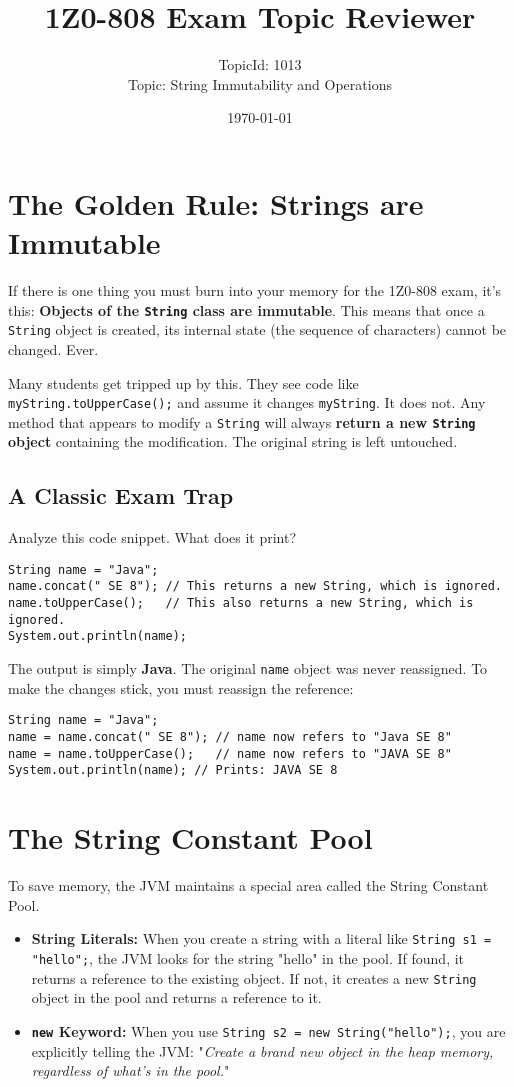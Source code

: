 \documentclass[12pt]{article}
\title{\textbf{1Z0-808 Exam Topic Reviewer}}
\author{TopicId: 1013 \\ Topic: String Immutability and Operations}
\date{\today}
\begin{document}
\maketitle
\newpage\begin{enumerate}[label=(\arabic*)]
\section*{The Golden Rule: Strings are Immutable}
If there is one thing you must burn into your memory for the 1Z0-808 exam, it's this: \textbf{Objects of the \texttt{String} class are immutable}. This means that once a \texttt{String} object is created, its internal state (the sequence of characters) cannot be changed. Ever.

Many students get tripped up by this. They see code like \texttt{myString.toUpperCase();} and assume it changes \texttt{myString}. It does not. Any method that appears to modify a \texttt{String} will always \textbf{return a new \texttt{String} object} containing the modification. The original string is left untouched.

\subsection*{A Classic Exam Trap}
Analyze this code snippet. What does it print?
\begin{verbatim}
String name = "Java";
name.concat(" SE 8"); // This returns a new String, which is ignored.
name.toUpperCase();   // This also returns a new String, which is ignored.
System.out.println(name);
\end{verbatim}
The output is simply \textbf{Java}. The original \texttt{name} object was never reassigned. To make the changes stick, you must reassign the reference:
\begin{verbatim}
String name = "Java";
name = name.concat(" SE 8"); // name now refers to "Java SE 8"
name = name.toUpperCase();   // name now refers to "JAVA SE 8"
System.out.println(name); // Prints: JAVA SE 8
\end{verbatim}

\section{The String Constant Pool}
To save memory, the JVM maintains a special area called the String Constant Pool. 
\begin{itemize}
    \item \textbf{String Literals:} When you create a string with a literal like \texttt{String s1 = "hello";}, the JVM looks for the string "hello" in the pool. If found, it returns a reference to the existing object. If not, it creates a new \texttt{String} object in the pool and returns a reference to it.
    \item \textbf{\texttt{new} Keyword:} When you use \texttt{String s2 = new String("hello");}, you are explicitly telling the JVM: "\textit{Create a brand new object in the heap memory, regardless of what's in the pool.}" 
\end{itemize}


\end{enumerate}
\end{document}
